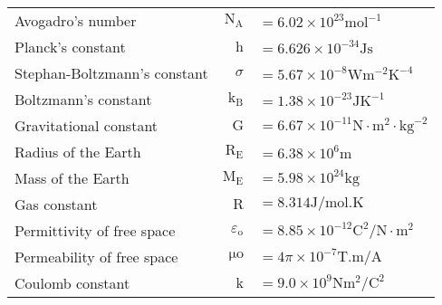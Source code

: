 \documentclass{extarticle}
\begin{document}
\markStart[50]
\begin{tabularx}{\textwidth}{Xr@{}l}
Avogadro's number & $\mathrm{N}_{\mathrm{A}}$ & $=6.02 \times 10^{23} \mathrm{mol}^{-1}$ \\
Planck's constant & $\mathrm{h}$ & $=6.626 \times 10^{-34} \mathrm{J} \mathrm{s}$ \\
Stephan-Boltzmann's constant & $\sigma$ & $=5.67 \times 10^{-8} \mathrm{W} \mathrm{m}^{-2} \mathrm{K}^{-4}$ \\
Boltzmann's constant & $\mathrm{k}_{\mathrm{B}}$ & $=1.38 \times 10^{-23} \mathrm{J} \mathrm{K}^{-1}$ \\



Gravitational constant & $\mathrm{G}$ & $=6.67 \times 10^{-11} \mathrm{N} \cdot \mathrm{m}^{2} \cdot \mathrm{kg}^{-2}$ \\
Radius of the Earth & $\mathrm{R}_{\mathrm{E}}$ & $=6.38 \times 10^{6} \mathrm{m}$ \\
Mass of the Earth & $\mathrm{M}_{\mathrm{E}}$ & $=5.98 \times 10^{24} \mathrm{kg}$ \\
Gas constant & $\mathrm{R}$ & $=8.314 \mathrm{J} / \mathrm{mol} . \mathrm{K}$ \\
Permittivity of free space & $\varepsilon_{\mathrm{o}}$ & $=8.85 \times 10^{-12} \mathrm{C}^{2} / \mathrm{N} \cdot \mathrm{m}^{2}$ \\
Permeability of free space & $\mathrm{\mu o}$ & $=4 \pi \times 10^{-7} \mathrm{T} . \mathrm{m} / \mathrm{A}$ \\
Coulomb constant & $\mathrm{k}$ & $=9.0 \times 10^{9} \mathrm{N} \mathrm{m}^{2} / \mathrm{C}^{2}$ \\

\end{tabularx}
\end{document}

